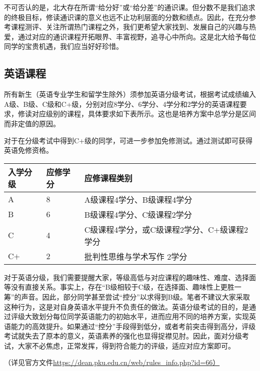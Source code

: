 \documentclass[11pt,oneside]{book}
\begin{document}
不可否认的是，北大存在所谓“给分好”或“给分差”的通识课。但分数不是我们追求的终极目标，修读通识课的意义也远不止功利层面的分数和绩点。因此，在充分参考课程测评、关注所谓热门课程之外，我们更希望大家找到、发展自己的兴趣与热爱，通过对应的通识课程开拓眼界、丰富视野，追寻心中所向。这是北大给予每位同学的宝贵机遇，我们应当好好珍惜。

\subsection{英语课程}
所有新生（英语专业学生和留学生除外）须参加英语分级考试，根据考试成绩编入A级、B级、C级和C+级，分别对应8学分、6学分、4学分和2学分的英语课程要求，修读对应级别的课程，具体要求如下表所示。这也是培养方案中总学分是区间而非定值的原因。

对于在分级考试中得到C+级的同学，可进一步参加免修测试。通过测试即可获得英语免修资格。

\begin{table}[htbp]
\centering

\begin{tabular}{| l | l | l |}
\hline
入学分级 & 应修学分 & 应修课程类别 \\
\hline
A & 8 & A级课程4学分、B级课程4学分 \\
\hline
B & 6 & B级课程4学分、C级课程2学分 \\
\hline
C & 4 & C级课程4学分，或C级课程2学分、C+级课程2学分 \\
\hline
C$+$  & 2 & 批判性思维与学术写作\hspace{6pt} 2学分 \\
\hline

\end{tabular}

\end{table}

对于英语分级，我们需要提醒大家，等级高低与对应课程的趣味性、难度、选择面等没有直接关系。事实上，存在“B级相较于C级，在选择面、趣味性上更胜一筹”的声音。因此，部分同学甚至尝试“控分”以求得到B级。笔者不建议大家采取这种行为，这是对自身英语水平提升不负责任的做法。英语分级考试的目的，是通过评级大致划分每位同学英语能力的初始水平，进而应用不同的培养方案，实现英语能力的高效提升。如果通过“控分”手段得到低分，或者考前突击得到高分，评级考试就失去了原本的意义，英语素养的强化也显得捉襟见肘。因此，面对分级考试，大家不必焦虑，正常发挥，得到符合能力的评级，适应对应方案即可。

（详见官方文件\href{https://dean.pku.edu.cn/web/rules_info.php?id=66\%EF\%BC\%89}{https://dean.pku.edu.cn/web/rules\_info.php?id=66）}
\end{document}
